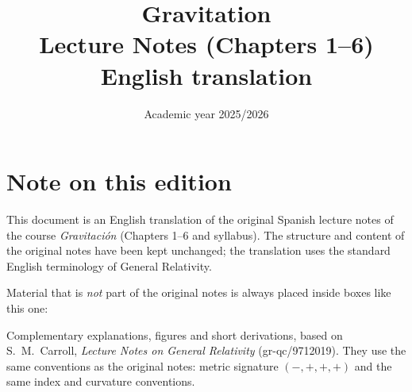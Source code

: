 \documentclass[11pt,letterpaper]{report}
\title{\Huge\bfseries Gravitation\\[0.5em]\Large Lecture Notes (Chapters 1--6)\\[0.3em]\large English translation}
\date{Academic year 2025/2026}
\author{}
\begin{document}
\maketitle
\tableofcontents
\chapter*{Note on this edition}
This document is an English translation of the original Spanish lecture notes of the course \emph{Gravitación} (Chapters 1--6 and syllabus). The structure and content of the original notes have been kept unchanged; the translation uses the standard English terminology of General Relativity.

Material that is \emph{not} part of the original notes is always placed inside boxes like this one:
\begin{carroll}
Complementary explanations, figures and short derivations, based on S.~M.~Carroll, \emph{Lecture Notes on General Relativity} (gr-qc/9712019). They use the same conventions as the original notes: metric signature $(-,+,+,+)$ and the same index and curvature conventions.
\end{carroll}







\end{document}
